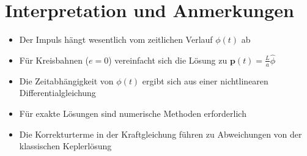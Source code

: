 \section{Interpretation und Anmerkungen}
\begin{itemize}
    \item Der Impuls hängt wesentlich vom zeitlichen Verlauf \( \phi(t) \) ab
    \item Für Kreisbahnen (\( e = 0 \)) vereinfacht sich die Lösung zu \( \mathbf{p}(t) = \frac{L}{a} \hat{\phi} \)
    \item Die Zeitabhängigkeit von \( \phi(t) \) ergibt sich aus einer nichtlinearen Differentialgleichung
    \item Für exakte Lösungen sind numerische Methoden erforderlich
    \item Die Korrekturterme in der Kraftgleichung führen zu Abweichungen von der klassischen Keplerlösung
\end{itemize}